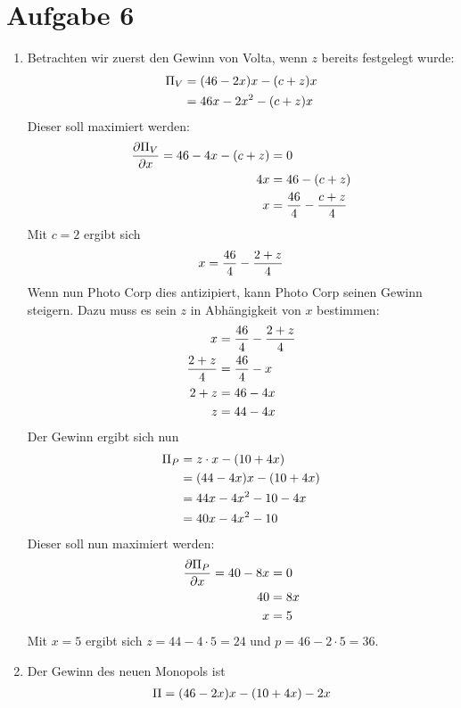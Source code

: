 \documentclass{article}
\begin{document}
	\section*{Aufgabe 6}
	\begin{enumerate}[label=(\alph*)]
		\item Betrachten wir zuerst den Gewinn von Volta, wenn $z$ bereits festgelegt wurde:
		\begin{align}
			\Pi_V &= (46-2x)x - (c+z)x \notag \\
			&= 46x - 2x^2 - (c+z)x \notag
		\end{align}
		Dieser soll maximiert werden:
		\begin{align}
			\frac{\partial\Pi_V}{\partial x} = 46-4x - (c+z) &= 0 \notag \\
			4x &= 46 - (c+z) \notag \\
			x &= \frac{46}{4} - \frac{c+z}{4} \notag
		\end{align}
		Mit $c=2$ ergibt sich
		\begin{align}
			x = \frac{46}{4} - \frac{2+z}{4} \notag
		\end{align}
		Wenn nun Photo Corp dies antizipiert, kann Photo Corp seinen Gewinn steigern. Dazu muss es sein $z$ in Abhängigkeit von $x$ bestimmen:
		\begin{align}
			x &= \frac{46}{4} - \frac{2+z}{4} \notag \\
			\frac{2+z}{4} &= \frac{46}{4} - x \notag \\
			2+z &= 46-4x \notag \\
			z &= 44-4x \notag
		\end{align}
		Der Gewinn ergibt sich nun
		\begin{align}
			\Pi_P &= z\cdot x - (10+4x) \notag \\
			&= (44-4x)x - (10+4x) \notag \\
			&= 44x-4x^2-10-4x \notag \\
			&= 40x - 4x^2 - 10 \notag
		\end{align}
		Dieser soll nun maximiert werden:
		\begin{align}
			\frac{\partial\Pi_P}{\partial x} = 40-8x &= 0 \notag \\
			40 &= 8x \notag \\
			x &= 5 \notag
		\end{align}
		Mit $x=5$ ergibt sich $z = 44-4\cdot 5 = 24$ und $p=46-2\cdot 5 = 36$.
		\item Der Gewinn des neuen Monopols ist
		\begin{align}
			\Pi &= (46-2x)x - (10+4x) - 2x \notag \\

\end{align}
\end{enumerate}
\end{document}
